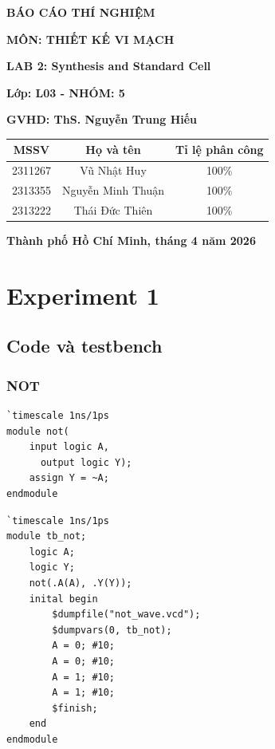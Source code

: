 \documentclass[12pt, a4paper, oneside]{article}
\begin{document}
\begin{titlepage}
\begin{center}
    \fontsize{18pt}{17pt}\selectfont 
    \textbf{BÁO CÁO THÍ NGHIỆM}

    \textbf{MÔN:  THIẾT KẾ VI MẠCH}
\end{center}
\begin{center}
    \fontsize{15pt}{17pt}\selectfont 
    \textbf{\textrm{LAB 2: Synthesis and Standard Cell}}
\end{center}

\begin{center}
    \vspace{15pt}
    \textbf{Lớp: L03 - NHÓM: 5}
    
    \textbf{GVHD: ThS. Nguyễn Trung Hiếu}
\end{center}

\vspace{10pt}

\begin{table}[h!]
\centering
\begin{tabular}{|c|c|c|}
\hline
\textbf{MSSV} & \textbf{Họ và tên} & \textbf{Tỉ lệ phân công} \\ \hline
2311267 & Vũ Nhật Huy & 100\% \\ \hline
2313355 & Nguyễn Minh Thuận & 100\% \\ \hline
2313222 & Thái Đức Thiên & 100\% \\ \hline
\end{tabular}
\end{table}
\vfill
\centerline{\bf Thành phố Hồ Chí Minh, tháng 4 năm 2026}

\vspace{1cm}
\end{titlepage}
\newpage
\tableofcontents
\newpage
\section{Experiment 1}
\subsection{Code và testbench}
\subsubsection{NOT}
\begin{lstlisting}[style={prettyverilog}, caption={\texttt{code thiết kế cổng NOT}}]
`timescale 1ns/1ps
module not(
    input logic A,
	  output logic Y);
    assign Y = ~A;
endmodule
\end{lstlisting}
\begin{lstlisting}[style={prettyverilog}, caption={\texttt{code testbench cổng NOT}}]
`timescale 1ns/1ps
module tb_not;
    logic A;
    logic Y;
    not(.A(A), .Y(Y));
    inital begin
        $dumpfile("not_wave.vcd");
        $dumpvars(0, tb_not);
        A = 0; #10;
        A = 0; #10;
        A = 1; #10;
        A = 1; #10;
        $finish;
    end
endmodule
\end{lstlisting}
\end{document}
